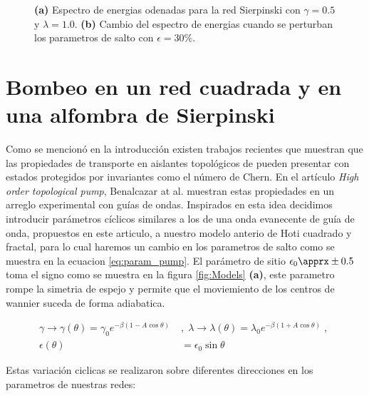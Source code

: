 \begin{figure}[h!]
\begin{subfigure}[b!]{0.5 \textwidth}
    \end{subfigure}\hspace*{-0.9em}
       \caption{\textbf{(a)} Espectro de energias odenadas para la red Sierpinski con $\gamma = 0.5$ y $\lambda = 1.0$. \textbf{(b)} Cambio del espectro de energias cuando se perturban los parametros de salto con $\epsilon = 30\%$.}
       \label{fig:spectre_fractal_epsi}
\end{figure}

\section{Bombeo en un red cuadrada y en una alfombra de Sierpinski}

Como se mencionó en la introducción existen trabajos recientes que muestran que las propiedades de transporte en aislantes topológicos de pueden presentar con estados protegidos por invariantes como el número de Chern. En el artículo \textit{High order topological pump}\cite{benalcazar2020higher}, Benalcazar at al. muestran estas propiedades en un arreglo experimental con guías de ondas. Inspirados en esta idea decidimos introducir parámetros cíclicos similares a los de una onda evanecente de guía de onda, propuestos en este articulo, a nuestro modelo anterio de Hoti cuadrado y fractal, para lo cual haremos un cambio en los parametros de salto como se muestra en la ecuacion \ref{eq:param_pump}. El parámetro de sitio $\epsilon_0 \apprx \pm 0.5$ toma el signo como se muestra en la figura \ref{fig:Models} \textbf{(a)}, este parametro rompe la simetria de espejo y permite que el moviemiento de los centros de wannier suceda de forma adiabatica.

\begin{align}
    \label{eq:param_pump}
    \nonumber\gamma \rightarrow \gamma (\theta) = \gamma_0 e^{\displaystyle-\beta(1 - A \cos \theta )} \; &,\;  \lambda \rightarrow \lambda(\theta) = \lambda_0 e^{\displaystyle-\beta( 1 + A \cos \theta )} \;,\; \\  \epsilon(\theta) &= \epsilon_0 \sin \theta
\end{align}

Estas variación ciclicas se realizaron sobre diferentes direcciones en los parametros de nuestras redes: 

